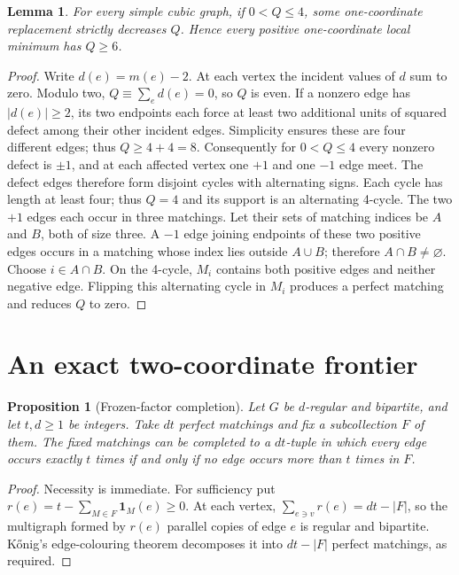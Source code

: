 \documentclass[11pt]{article}
\newtheorem{proposition}[theorem]{Proposition}
\newtheorem{lemma}[theorem]{Lemma}
\begin{document}
\begin{lemma}\label{lem:lower}
For every simple cubic graph, if $0<Q\le4$, some one-coordinate
replacement strictly decreases $Q$. Hence every positive one-coordinate
local minimum has $Q\ge6$.
\end{lemma}
\begin{proof}
Write $d(e)=m(e)-2$. At each vertex the incident values of $d$ sum
to zero. Modulo two, $Q\equiv\sum_e d(e)=0$, so $Q$ is even.
If a nonzero edge has $|d(e)|\ge2$, its two endpoints each force
at least two additional units of squared defect among their other
incident edges. Simplicity ensures these are four different edges;
thus $Q\ge 4+4=8$. Consequently for $0<Q\le4$ every nonzero
defect is $\pm1$, and at each affected vertex one $+1$ and one
$-1$ edge meet. The defect edges therefore form disjoint cycles
with alternating signs. Each cycle has length at least four;
thus $Q=4$ and its support is an alternating 4-cycle.
The two $+1$ edges each occur in three matchings. Let their
sets of matching indices be $A$ and $B$, both of size three.
A $-1$ edge joining endpoints of these two positive edges
occurs in a matching whose index lies outside $A\cup B$;
therefore $A\cap B\ne\varnothing$. Choose $i\in A\cap B$.
On the 4-cycle, $M_i$ contains both positive edges and neither
negative edge. Flipping this alternating cycle in $M_i$ produces
a perfect matching and reduces $Q$ to zero.
\end{proof}

\section{An exact two-coordinate frontier}
\begin{proposition}[Frozen-factor completion]\label{prop:frozen}
Let $G$ be $d$-regular and bipartite, and let $t,d\ge1$ be integers.
Take $dt$ perfect matchings and fix a subcollection $F$ of them.
The fixed matchings can be completed to a $dt$-tuple in which every
edge occurs exactly $t$ times if and only if no edge occurs more
than $t$ times in $F$.
\end{proposition}
\begin{proof}
Necessity is immediate. For sufficiency put
$r(e)=t-\sum_{M\in F}\mathbf1_M(e)\ge0$.
At each vertex, $\sum_{e\ni v}r(e)=dt-|F|$, so the multigraph
formed by $r(e)$ parallel copies of edge $e$ is regular and bipartite.
K\H onig's edge-colouring theorem decomposes it into $dt-|F|$
perfect matchings, as required.
\end{proof}
\end{document}
